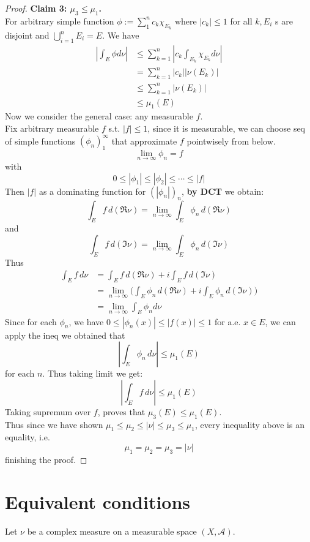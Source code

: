 \documentclass[lang=cn,11pt]{elegantbook}
\begin{document}
\begin{proof}
\textbf{Claim 3: $\mu_3 \leq \mu_1$.}\\
For arbitrary simple function $\phi:=\sum_1^n c_k \chi_{E_k}$ where $\left|c_k\right| \leq 1$ for all $k, E_i$ s are disjoint and $\bigcup_{i=1}^n E_i=E$. We have\begin{align*}
    \left|\int_E \phi d \nu\right| &\leq \sum_{k=1}^n\left|c_k \int_{E_k} \chi_{E_k} d \nu\right|\\
    &=\sum_{k=1}^n\left|c_k\right|\left|\nu\left(E_k\right)\right| \\
    &\leq \sum_{k=1}^n\left|\nu\left(E_k\right)\right| \\
    &\leq \mu_1(E)
\end{align*}
Now we consider the general case: any measurable $f$.\\
Fix arbitrary measurable $f$ s.t. $|f| \leq 1$, since it is measurable, we can choose seq of simple functions  $(\phi_n)_1^\infty$ that approximate $f$ pointwisely from below.\\
\[
\lim_{n\to \infty} \phi_n   = f
\]with \[
  0\leq |\phi_1 |\leq |\phi_2| \leq \cdots \leq | f| 
\]
Then $|f|$ as a dominating function for $( |\phi_n|)_n$, \textbf{by DCT }we obtain: \[
\int_E f \, d (\Re \nu) = \lim_{n\to \infty} \int_E \phi_n \, d (\Re \nu) 
\]
and \[
\int_E f \, d (\Im \nu) =  \lim_{n\to \infty} \int_E \phi_n \, d (\Im \nu) 
\]
Thus
\begin{align*}
    \int_E f \, d\nu &= \int_E  f \, d(\Re \nu) + i\int_E  f \, d(\Im \nu)\\
    &= \lim_{n\to \infty} \bigg( \int_E \phi_n \, d (\Re \nu)  + i  \int_E \phi_n \, d (\Im \nu)  \bigg)\\
    & =  \lim_{n\to \infty} \int _E \phi_n d \nu
\end{align*}
Since for each $\phi_n$, we have $0 \leq |\phi_n(x)|  \leq |f(x)|\leq 1$ for a.e. $x\in E$, we can apply the ineq we obtained that \[  \left|\int_E \phi_n \, d \nu\right|   \leq  \mu_1(E)\] for each $n$. Thus taking limit we get: \[
        \left|\int_E f \, d \nu\right|   \leq  \mu_1(E) 
    \]
Taking supremum over $f$, proves that $\mu_3(E) \leq \mu_1(E)$. \\
Thus since we have shown $\mu_1 \leq \mu_2 \leq|\nu| \leq \mu_3 \leq \mu_1$, every inequality above is an equality, i.e.\[
\mu_1=\mu_2=\mu_3=|\nu|
\]finishing the proof.
\end{proof}






\section{Equivalent conditions}
  Let $\nu$ be a complex measure on a measurable space $(X,\mathcal{A})$. 
\end{document}
